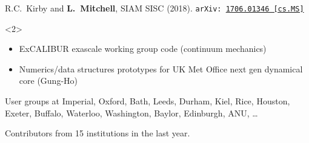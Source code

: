 \documentclass[presentation,aspectratio=43, 10pt]{beamer}
\newcommand{\arxivlink}[2]{{\texttt{arXiv:\,\href{https://arxiv.org/abs/#1}{#1\,[#2]}}}}
\begin{document}
\begin{frame}
\begin{overlayarea}{\textwidth}{0.6\textheight}
\begin{onlyenv}
\begin{flushright}
{      R.C.~Kirby and \textbf{L.~Mitchell}, SIAM SISC (2018). \arxivlink{1706.01346}{cs.MS}\nocite{Kirby:2018}}
    \end{flushright}
  \end{onlyenv}
  \begin{onlyenv}<2>
    \begin{itemize}
    \item ExCALIBUR exascale working group code (continuum mechanics)
    \item Numerics/data structures prototypes for UK Met Office next
      gen dynamical core (Gung-Ho)
    \end{itemize}
    \begin{block}{User groups at}
      Imperial, Oxford, Bath, Leeds, Durham, Kiel, Rice, Houston,
      Exeter, Buffalo, Waterloo, Washington, Baylor, Edinburgh, ANU, \dots

      Contributors from 15 institutions in the last year.
    \end{block}
  \end{onlyenv}
\end{overlayarea}
\end{frame}
\end{document}
